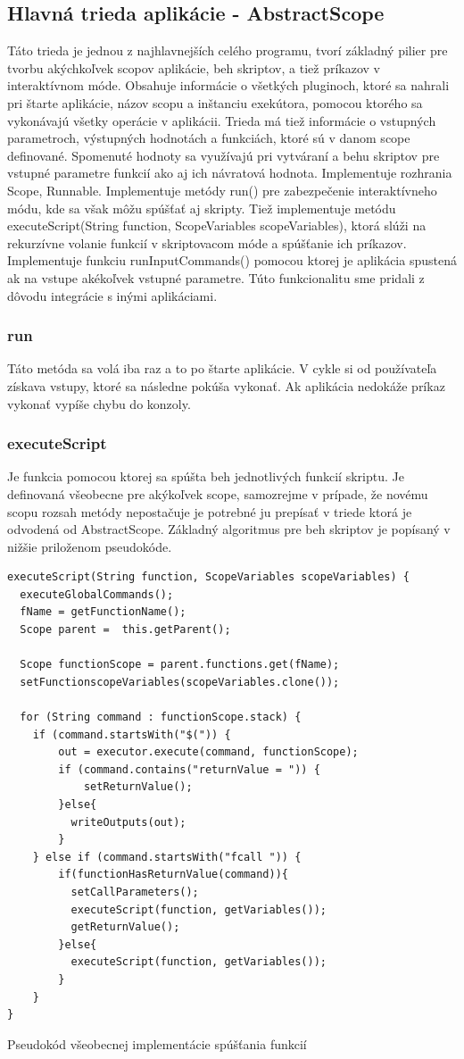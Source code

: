 \subsection{Hlavná trieda aplikácie - AbstractScope}
Táto trieda je jednou z najhlavnejších celého programu, tvorí základný pilier pre tvorbu akýchkoľvek scopov aplikácie, beh skriptov, a tiež príkazov v interaktívnom móde. Obsahuje informácie o všetkých pluginoch, ktoré sa nahrali pri štarte aplikácie, názov scopu a inštanciu exekútora, pomocou ktorého sa vykonávajú všetky operácie v aplikácii. Trieda má tiež informácie o vstupných parametroch, výstupných hodnotách a funkciách, ktoré sú v danom scope definované. Spomenuté hodnoty sa využívajú pri vytváraní a behu skriptov pre vstupné parametre funkcií ako aj ich návratová hodnota. Implementuje rozhrania Scope, Runnable. Implementuje metódy run() pre zabezpečenie interaktívneho módu, kde sa však môžu spúšťať aj skripty. Tiež implementuje metódu executeScript(String function, ScopeVariables scopeVariables), ktorá slúži na rekurzívne volanie funkcií v skriptovacom móde a  spúšťanie ich príkazov.
Implementuje funkciu runInputCommands() pomocou ktorej je aplikácia spustená ak na vstupe akékoľvek vstupné parametre. Túto funkcionalitu sme pridali z dôvodu integrácie s inými aplikáciami. 
\subsubsection{run}
\indent Táto metóda sa volá iba raz a to po štarte aplikácie. V cykle si od používateľa získava vstupy, ktoré sa následne pokúša vykonať. Ak aplikácia nedokáže príkaz vykonať vypíše chybu do konzoly.
\subsubsection{executeScript}
\indent Je funkcia pomocou ktorej sa spúšta beh jednotlivých funkcií skriptu. Je definovaná všeobecne pre akýkoľvek scope, samozrejme v prípade, že novému scopu rozsah metódy nepostačuje je potrebné ju prepísať v triede ktorá je odvodená od AbstractScope. Základný algoritmus pre beh skriptov je popísaný v nižšie priloženom pseudokóde.
\begin{algorithm}[H]
	\begin{verbatim}
executeScript(String function, ScopeVariables scopeVariables) {
  executeGlobalCommands();
  fName = getFunctionName();
  Scope parent =  this.getParent();

  Scope functionScope = parent.functions.get(fName);
  setFunctionscopeVariables(scopeVariables.clone());

  for (String command : functionScope.stack) {
	if (command.startsWith("$(")) {
		out = executor.execute(command, functionScope);
		if (command.contains("returnValue = ")) {
			setReturnValue();
		}else{
		  writeOutputs(out);
		}
	} else if (command.startsWith("fcall ")) {
		if(functionHasReturnValue(command)){
		  setCallParameters();
		  executeScript(function, getVariables());
		  getReturnValue();
		}else{
		  executeScript(function, getVariables());
		}
	}
}
\end{verbatim}
\caption{Pseudokód všeobecnej implementácie spúšťania funkcií}
\label{alg:gen}
\end{algorithm}
